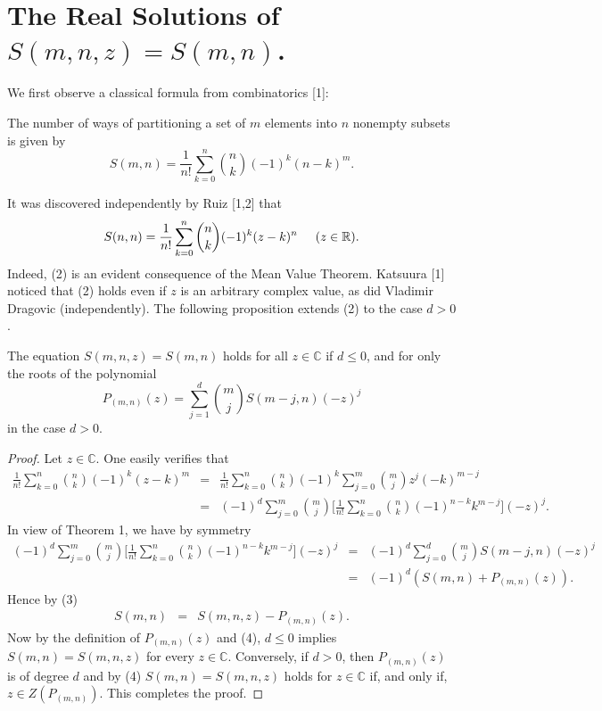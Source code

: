 \documentclass[]{amsart}
\begin{document}
\section{The Real Solutions of $S(m,n,z) = S(m,n)$.}
We first observe a classical formula from combinatorics [1]:
\begin{thm}
The number of ways of partitioning a set of $m$ elements into $n$ nonempty subsets is given by
\begin{equation}
S(m,n) = \frac{1}{n!}\sum_{k=0}^{n}{n \choose k}(-1)^{k}(n-k)^{m}.
\end{equation}
\end{thm}
It was discovered independently by Ruiz [1,2] that
\begin{equation}
S(n,n) = \frac{1}{n!}\sum_{k=0}^{n}{n \choose k}(-1)^{k}(z-k)^{n} \hspace{5mm} (z \in \mathbb{R}).
\end{equation}
Indeed, (2) is an evident consequence of the Mean Value Theorem.  Katsuura [1] noticed that (2) holds even if $z$ is an arbitrary complex value, as did Vladimir Dragovic (independently).  The following proposition extends (2) to the case $d > 0$.
\begin{prop}
The equation $S(m,n,z) = S(m,n)$ holds for all $z \in \mathbb{C}$ if $d \leq 0$, and for only the roots of the polynomial
\[ P_{(m,n)}(z) = \sum_{j=1}^{d}{m \choose j}S(m-j,n)(-z)^{j} \]
in the case $d > 0$.
\end{prop}
\begin{proof}
Let $z \in \mathbb{C}$.  One easily verifies that
\begin{eqnarray}
\frac{1}{n!}\sum_{k=0}^{n}{n \choose k}(-1)^{k}(z-k)^{m} & = & \frac{1}{n!}\sum_{k=0}^{n}{n \choose k}(-1)^{k}\sum_{j=0}^{m}{m \choose j}z^{j}(-k)^{m-j} \nonumber \\ \nonumber
														 & = & (-1)^{d}\sum_{j=0}^{m}{m \choose j}\Bigg[\frac{1}{n!}\sum_{k=0}^{n}{n \choose k}(-1)^{n-k}k^{m-j}\Bigg](-z)^{j} \nonumber.
\end{eqnarray}
In view of Theorem 1, we have by symmetry
\begin{eqnarray}
(-1)^{d}\sum_{j=0}^{m}{m \choose j}\Bigg[\frac{1}{n!}\sum_{k=0}^{n}{n \choose k}(-1)^{n-k}k^{m-j}\Bigg](-z)^{j} & = &
																					(-1)^{d}\sum_{j=0}^{d}{m \choose j}S(m-j,n)(-z)^{j} \nonumber \\
																						& = & (-1)^{d}(S(m,n) + P_{(m,n)}(z)).
\end{eqnarray}
Hence by (3)
\begin{eqnarray}
S(m,n) & = & S(m,n,z) - P_{(m,n)}(z). 
\end{eqnarray}
Now by the definition of $P_{(m,n)}(z)$ and (4), $d \leq 0$ implies $S(m,n) = S(m,n,z)$ for every $z \in \mathbb{C}$.  Conversely, if $d > 0$, then $P_{(m,n)}(z)$ is of degree $d$ and by (4) $S(m,n) = S(m,n,z)$ holds for $z \in \mathbb{C}$ if, and only if, $z \in Z(P_{(m,n)})$.  This completes the proof.
\end{proof}
\end{document}
